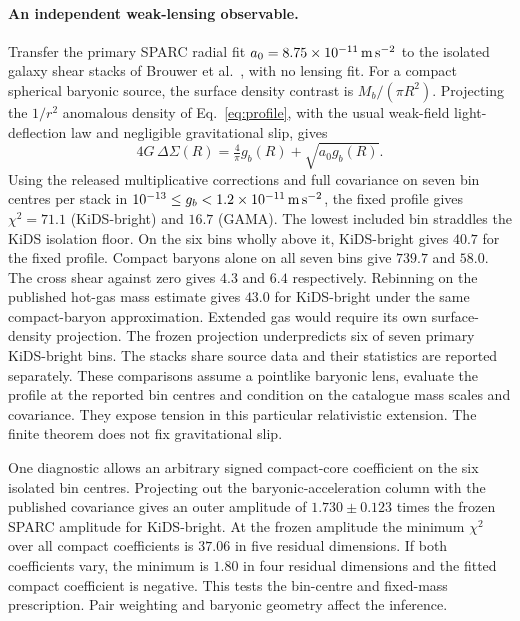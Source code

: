 \documentclass[11pt]{article}
\begin{document}
\paragraph{An independent weak-lensing observable.}
Transfer the primary SPARC radial fit
$a_0=8.75\times10^{-11}\,{\rm m\,s^{-2}}$ to the isolated
galaxy shear stacks of Brouwer et al.\ \cite{brouwer2021}, with no
lensing fit. For a compact spherical baryonic source, the surface
density contrast is $M_b/(\pi R^2)$. Projecting the $1/r^2$ anomalous
density of Eq.~\eqref{eq:profile}, with the usual weak-field
light-deflection law and negligible gravitational slip, gives
\[
 4G\,\Delta\Sigma(R)=\tfrac4\pi g_b(R)+\sqrt{a_0 g_b(R)} .
\]
Using the released multiplicative corrections and full covariance on
seven bin centres per stack in
$10^{-13}\le g_b<1.2\times10^{-11}\,{\rm m\,s^{-2}}$, the fixed
profile gives $\chi^2=71.1$ (KiDS-bright) and $16.7$ (GAMA).
The lowest included bin straddles the KiDS isolation floor. On the
six bins wholly above it, KiDS-bright gives $40.7$ for the fixed profile.
Compact baryons alone on all seven bins give $739.7$ and $58.0$. The cross shear against
zero gives $4.3$ and $6.4$ respectively. Rebinning on the published hot-gas mass estimate gives $43.0$ for
KiDS-bright under the same compact-baryon approximation. Extended gas
would require its own surface-density projection. The frozen projection
underpredicts six of seven primary KiDS-bright bins. The stacks share
source data and their statistics are reported separately. These
comparisons assume a pointlike baryonic lens, evaluate the profile at
the reported bin centres and condition on the catalogue mass scales
and covariance. They expose tension in this particular relativistic
extension. The finite theorem does not fix gravitational slip.

One diagnostic allows an arbitrary signed compact-core coefficient
on the six isolated bin centres. Projecting out the baryonic-acceleration
column with the published covariance gives an outer amplitude of
$1.730\pm0.123$ times the frozen SPARC amplitude for KiDS-bright.
At the frozen amplitude the minimum $\chi^2$ over all compact coefficients
is $37.06$ in five residual dimensions. If both coefficients vary, the
minimum is $1.80$ in four residual dimensions and the fitted compact
coefficient is negative. This tests the bin-centre and fixed-mass
prescription. Pair weighting and baryonic geometry affect the inference.
\end{document}
